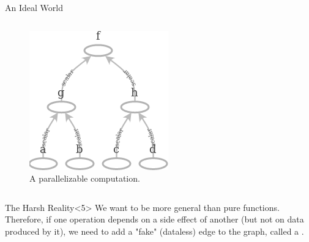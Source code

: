 \begin{frame}
\begin{block}{An Ideal World}
\begin{columns}
    \begin{column}{0.25\linewidth}
        \vspace{-2ex}
        \begin{figure}[h]
            \centering
            \includegraphics[width=\linewidth]{utils/parallel_graph.png}
            \caption{A parallelizable computation.}
        \end{figure}
    \end{column}
    \end{columns}
    \end{block}

    \begin{block}{The Harsh Reality}<5>
    We want  to be more general than pure functions. Therefore, if one operation depends
    on a side effect of another (but not on data produced by it), we need to add a "fake" (dataless) 
    edge to the graph, called a \emph{}.
    \end{block}
\end{frame}

